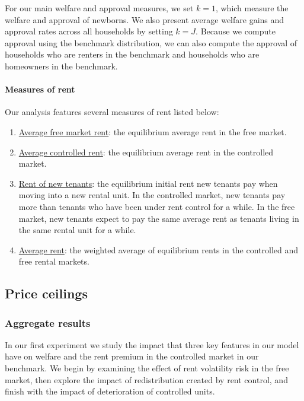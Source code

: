 \documentclass[parskip=full]{article}
\begin{document}
\noindent For our main welfare and approval measures, we set $k=1$, which measure the welfare and approval of newborns. We also present average welfare gains and approval rates across all households by setting $k=J$. Because we compute approval using the benchmark distribution, we can also compute the approval of households who are renters in the benchmark and households who are homeowners in the benchmark. 

\paragraph{Measures of rent} Our analysis features several measures of rent listed below: 

\begin{enumerate}
    \item \underline{Average free market rent}: the equilibrium average rent in the free market.
    \item \underline{Average controlled rent}: the equilibrium average rent in the controlled market.
    \item \underline{Rent of new tenants}: the equilibrium initial rent new tenants pay when moving into a new rental unit. In the controlled market, new tenants pay more than tenants who have been under rent control for a while. In the free market, new tenants expect to pay the same average rent as tenants living in the same rental unit for a while.
    \item \underline{Average rent}: the weighted average of equilibrium rents in the controlled and free rental markets.
\end{enumerate}

\subsection{Price ceilings}

\subsubsection{Aggregate results}

In our first experiment we study the impact that three key features in our model have on welfare and the rent premium in the controlled market in our benchmark. We begin by examining the effect of rent volatility risk in the free market, then explore the impact of redistribution created by rent control, and finish with the impact of deterioration of controlled units. 
\end{document}
